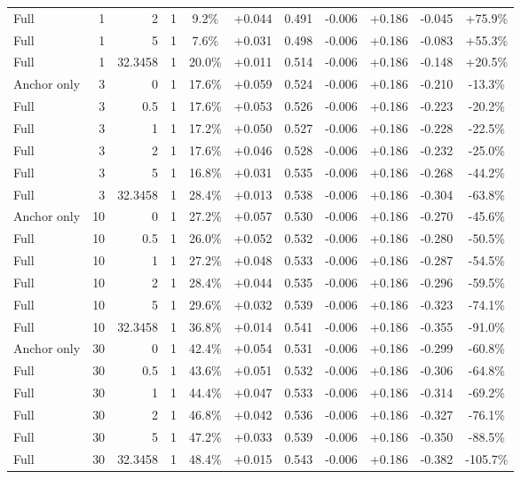 \begin{table}[htbp]
\begin{tabular}{lrrrccccccc}
Full & 1 & 2 & 1 & 9.2\% & +0.044 & 0.491 & -0.006 & +0.186 & -0.045 & +75.9\% \\
Full & 1 & 5 & 1 & 7.6\% & +0.031 & 0.498 & -0.006 & +0.186 & -0.083 & +55.3\% \\
Full & 1 & 32.3458 & 1 & 20.0\% & +0.011 & 0.514 & -0.006 & +0.186 & -0.148 & +20.5\% \\
Anchor only & 3 & 0 & 1 & 17.6\% & +0.059 & 0.524 & -0.006 & +0.186 & -0.210 & -13.3\% \\
Full & 3 & 0.5 & 1 & 17.6\% & +0.053 & 0.526 & -0.006 & +0.186 & -0.223 & -20.2\% \\
Full & 3 & 1 & 1 & 17.2\% & +0.050 & 0.527 & -0.006 & +0.186 & -0.228 & -22.5\% \\
Full & 3 & 2 & 1 & 17.6\% & +0.046 & 0.528 & -0.006 & +0.186 & -0.232 & -25.0\% \\
Full & 3 & 5 & 1 & 16.8\% & +0.031 & 0.535 & -0.006 & +0.186 & -0.268 & -44.2\% \\
Full & 3 & 32.3458 & 1 & 28.4\% & +0.013 & 0.538 & -0.006 & +0.186 & -0.304 & -63.8\% \\
Anchor only & 10 & 0 & 1 & 27.2\% & +0.057 & 0.530 & -0.006 & +0.186 & -0.270 & -45.6\% \\
Full & 10 & 0.5 & 1 & 26.0\% & +0.052 & 0.532 & -0.006 & +0.186 & -0.280 & -50.5\% \\
Full & 10 & 1 & 1 & 27.2\% & +0.048 & 0.533 & -0.006 & +0.186 & -0.287 & -54.5\% \\
Full & 10 & 2 & 1 & 28.4\% & +0.044 & 0.535 & -0.006 & +0.186 & -0.296 & -59.5\% \\
Full & 10 & 5 & 1 & 29.6\% & +0.032 & 0.539 & -0.006 & +0.186 & -0.323 & -74.1\% \\
Full & 10 & 32.3458 & 1 & 36.8\% & +0.014 & 0.541 & -0.006 & +0.186 & -0.355 & -91.0\% \\
Anchor only & 30 & 0 & 1 & 42.4\% & +0.054 & 0.531 & -0.006 & +0.186 & -0.299 & -60.8\% \\
Full & 30 & 0.5 & 1 & 43.6\% & +0.051 & 0.532 & -0.006 & +0.186 & -0.306 & -64.8\% \\
Full & 30 & 1 & 1 & 44.4\% & +0.047 & 0.533 & -0.006 & +0.186 & -0.314 & -69.2\% \\
Full & 30 & 2 & 1 & 46.8\% & +0.042 & 0.536 & -0.006 & +0.186 & -0.327 & -76.1\% \\
Full & 30 & 5 & 1 & 47.2\% & +0.033 & 0.539 & -0.006 & +0.186 & -0.350 & -88.5\% \\
Full & 30 & 32.3458 & 1 & 48.4\% & +0.015 & 0.543 & -0.006 & +0.186 & -0.382 & -105.7\% \\

\end{tabular}
\end{table}
